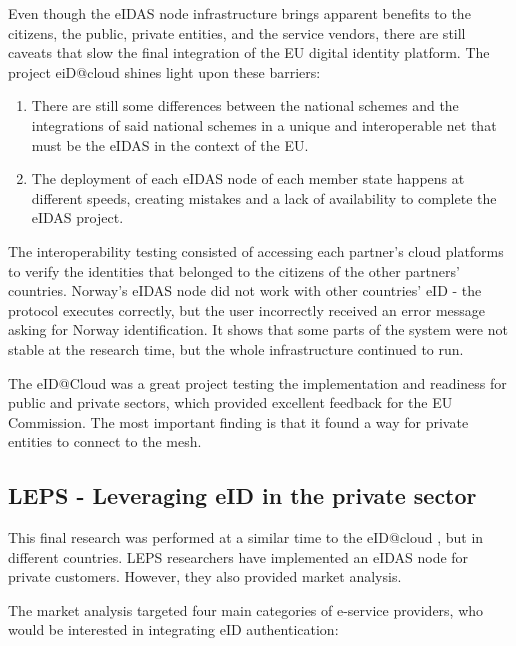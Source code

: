 Even though the eIDAS node infrastructure brings apparent benefits to the citizens, the public, private entities, and the service vendors, there are still caveats that slow the final integration of the EU digital identity platform. The project eiD@cloud shines light upon these barriers:

\begin{enumerate}
    \item There are still some differences between the national schemes and the integrations of said national schemes in a unique and interoperable net that must be the eIDAS in the context of the EU.
    \item The deployment of each eIDAS node of each member state happens at different speeds, creating mistakes and a lack of availability to complete the eIDAS project. 
\end{enumerate}

The interoperability testing consisted of accessing each partner's cloud platforms to verify the identities that belonged to the citizens of the other partners' countries. Norway's eIDAS node did not work with other countries' eID - the protocol executes correctly, but the user incorrectly received an error message asking for Norway identification. It shows that some parts of the system were not stable at the research time, but the whole infrastructure continued to run.

The eID@Cloud was a great project testing the implementation and readiness for public and private sectors, which provided excellent feedback for the EU Commission. The most important finding is that it found a way for private entities to connect to the mesh.

\subsection{LEPS - Leveraging eID in the private sector}

This final research \cite{Martin2019303} was performed at a similar time to the eID@cloud \cite{guerola2019eid}, but in different countries. LEPS researchers 
have implemented an eIDAS node for private customers. However, they also provided market analysis.

The market analysis targeted four main categories of e-service providers, who would be interested in integrating eID authentication:

